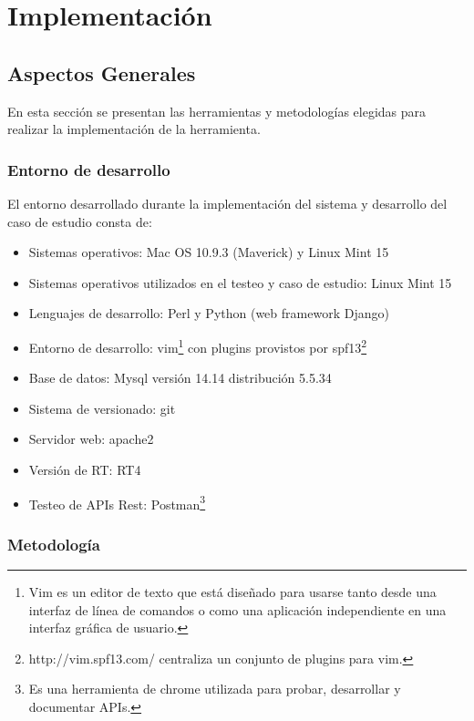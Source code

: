 \chapter{Implementación}
\label{capitulo5}
\section{Aspectos Generales}
En esta sección se presentan las herramientas y metodologías elegidas para realizar la implementación de la herramienta.

\subsection{Entorno de desarrollo}
El entorno desarrollado durante la implementación del sistema y desarrollo del caso de estudio consta de:

\begin{itemize}
	\item Sistemas operativos: Mac OS 10.9.3 (Maverick) y Linux Mint 15
	\item Sistemas operativos utilizados en el testeo y caso de estudio: Linux Mint 15
	\item Lenguajes de desarrollo: Perl y Python (web framework Django)
	\item Entorno de desarrollo: vim\footnote{Vim es un editor de texto que está diseñado para usarse tanto desde una interfaz de línea de comandos o como una aplicación independiente en una interfaz gráfica de usuario.}  con plugins provistos por spf13\footnote{http://vim.spf13.com/ centraliza un conjunto de plugins para vim.}
	\item Base de datos: Mysql versión 14.14 distribución 5.5.34
	\item Sistema de versionado: git
	\item Servidor web: apache2
	\item Versión de RT: RT4
	\item Testeo de APIs Rest: Postman\footnote{Es una herramienta de chrome utilizada para probar, desarrollar y documentar APIs.}
	
\end{itemize}

\subsection{Metodología}

